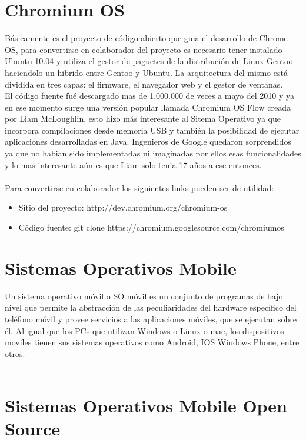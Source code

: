 \section{Chromium OS}

Básicamente es el proyecto de código abierto que guia el desarrollo de Chrome OS, para convertirse en colaborador del proyecto es necesario tener instalado Ubuntu 10.04 y utiliza el gestor de paguetes de la distribución de Linux Gentoo haciendolo un hibrido entre Gentoo y Ubuntu. La arquitectura del mismo está dividida en tres capas: el firmware, el navegador web y el gestor de ventanas.
\\
El código fuente fué descargado mas de 1.000.000 de veces a mayo del 2010 y ya en ese momento surge una versión popular llamada Chromium OS Flow creada por Liam McLoughlin, esto hizo más interesante al Sitema Operativo ya que incorpora compilaciones desde memoria USB y también la posibilidad de ejecutar aplicaciones desarrolladas en Java. Ingenieros de Google quedaron sorprendidos ya que no habian sido implementadas ni imaginadas por ellos esas funcionalidades y lo mas interesante aún es que Liam solo tenia 17 años a ese entonces.
\\
\\
Para convertirse en colaborador los siguientes links pueden ser de utilidad:
\begin{itemize}
     \item Sitio del proyecto: http://dev.chromium.org/chromium-os
     \item C\'odigo fuente: git clone https://chromium.googlesource.com/chromiumos
\end{itemize}

\section{Sistemas Operativos Mobile}

Un sistema operativo móvil o SO móvil es un conjunto de programas de bajo nivel que permite la abstracción de las peculiaridades del hardware específico del teléfono móvil y provee servicios a las aplicaciones móviles, que se ejecutan sobre él. Al igual que los PCs que utilizan Windows o Linux o mac, los dispositivos moviles tienen sus sistemas operativos como Android, IOS Windows Phone, entre otros.
\\
\\

\section{Sistemas Operativos Mobile Open Source}

